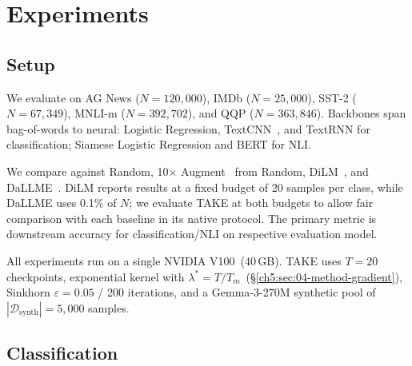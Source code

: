 \section{Experiments} \label{sec:55-research03-experiments}

\subsection{Setup} \label{ch5:sec:05-setup}

\begin{foldable} %
    We evaluate on AG News ($N{=}120{,}000$), IMDb ($N{=}25{,}000$), SST-2 ($N{=}67{,}349$), MNLI-m ($N{=}392{,}702$), and QQP ($N{=}363{,}846$).
    Backbones span bag-of-words to neural: Logistic Regression, TextCNN~\cite{kim2014convolutional}, and TextRNN for classification; Siamese Logistic Regression and BERT for NLI.
\end{foldable}

\begin{foldable} %
    We compare against Random, 10$\times$ Augment~\cite{wei2019eda} from Random, DiLM~\cite{maekawa2024dilm}, and DaLLME~\cite{tao2024textual}.
    DiLM reports results at a fixed budget of 20 samples per class, while DaLLME uses 0.1\% of $N$; we evaluate TAKE at both budgets to allow fair comparison with each baseline in its native protocol.
    The primary metric is downstream accuracy for classification/NLI on respective evaluation model.
\end{foldable}

\begin{foldable} %
    All experiments run on a single NVIDIA V100~(40\,GB).
    TAKE uses $T{=}20$ checkpoints, exponential kernel with $\lambda^* = T/T_m$~(\S\ref{ch5:sec:04-method-gradient}), Sinkhorn $\varepsilon{=}0.05$ / 200 iterations, and a Gemma-3-270M synthetic pool of $|\mathcal{D}_\text{synth}|{=}5{,}000$ samples.
\end{foldable}

\subsection{Classification} \label{ch5:sec:05-results-classification}

